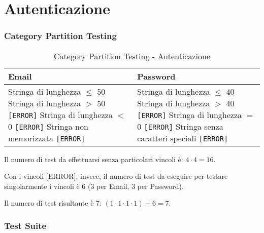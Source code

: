 \section{Autenticazione}
\subsubsection*{Category Partition Testing}
\begin{table}[H]
    \centering
    \footnotesize
    \renewcommand{\arraystretch}{1.5}
    \begin{tabular}{|p{6cm}|p{6cm}|}
       \hline
       \textbf{Email} & \textbf{Password} \\
       \hline
       Stringa di lunghezza $\leq$ 50 \newline
       Stringa di lunghezza $>$ 50 \texttt{[ERROR]} \newline
       Stringa di lunghezza $<$ 0 \texttt{[ERROR]} \newline
       Stringa non memorizzata \texttt{[ERROR]} &

       Stringa di lunghezza $\leq$ 40 \newline
       Stringa di lunghezza $>$ 40 \texttt{[ERROR]} \newline
       Stringa di lunghezza $=$ 0 \texttt{[ERROR]} \newline
       Stringa senza caratteri speciali \texttt{[ERROR]} \\
       \hline
    \end{tabular}
    \caption{Category Partition Testing - Autenticazione}
\end{table}

\noindent Il numero di test da effettuarsi senza particolari vincoli è: $4 \cdot 4 = 16$.

\noindent Con i vincoli [ERROR], invece, il numero di test da eseguire per testare singolarmente i vincoli è 6 (3 per Email, 3 per Password).

\noindent Il numero di test risultante è 7: $(1 \cdot 1 \cdot 1 \cdot 1) + 6 = 7$.

\subsubsection*{Test Suite}


